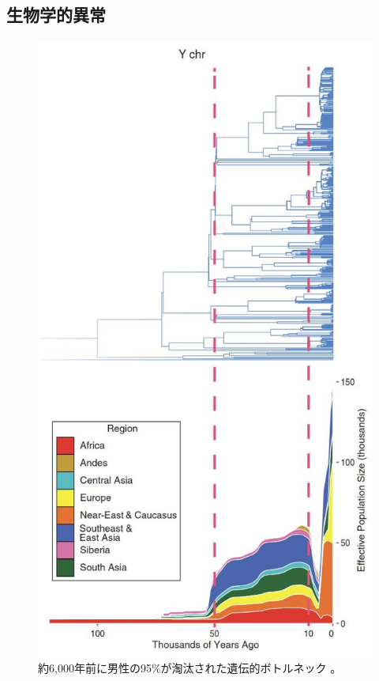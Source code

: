 \documentclass[10pt,twocolumn,letterpaper]{article}
\begin{document}
\subsection{生物学的異常}
\begin{figure}[b]
\begin{center}
   \includegraphics[width=1\linewidth]{bottleneck.jpg}
\end{center}
   \caption{約6,000年前に男性の95\%が淘汰された遺伝的ボトルネック \cite{62}。}
\label{fig:10}
\label{fig:onecol}
\end{figure}
\end{document}
